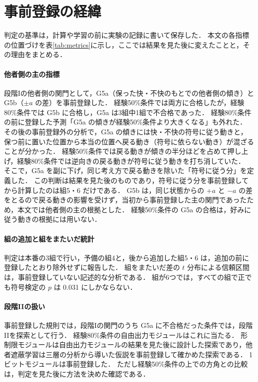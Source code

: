 \section{事前登録の経緯}\label{app:prereg}
判定の基準は，計算や学習の前に実験の記録に書いて保存した．
本文の各指標の位置づけを表\ref{tab:metrics}に示し，ここでは結果を見た後に変えたことと，その理由をまとめる．

\paragraph{他者側の主の指標}
段階Iの他者側の関門として，G5a（保った快・不快のもとでの他者側の傾き）と G5b（$\pm a$ の差）を事前登録した．
経験50\%条件では両方に合格したが，経験80\%条件では G5b に合格し，G5a は3組中1組で不合格であった．
経験80\%条件の前に登録した予測「G5a の傾きが経験50\%条件より大きくなる」も外れた．
その後の事前登録外の分析で，G5a の傾きには快・不快の符号に従う動きと，保つ前に置いた位置から本当の位置へ戻る動き（符号に依らない動き）が混ざることが分かった．
経験50\%条件では戻る動きが傾きの半分ほどを占めて押し上げ，経験80\%条件では逆向きの戻る動きが符号に従う動きを打ち消していた．
そこで，G5a を副に下げ，同じ考え方で戻る動きを除いた「符号に従う分」を定義した．
この判断は結果を見た後のものであり，符号に従う分を事前登録してから計算したのは組5・6 だけである．
G5b は，同じ状態からの $+a$ と $-a$ の差をとるので戻る動きの影響を受けず，当初から事前登録した主の関門であったため，本文では他者側の主の根拠とした．
経験50\%条件の G5a の合格は，好みに従う動きの根拠には用いない．

\paragraph{組の追加と組をまたいだ統計}
判定は本番の3組で行い，予備の組4と，後から追加した組5・6 は，追加の前に登録したとおり除外せずに報告した．
組をまたいだ差の $t$ 分布による信頼区間は，事前登録していない記述的な分析である．
組が6つでは，すべての組で正でも符号検定の $p$ は 0.031 にしかならない．

\paragraph{段階IIの扱い}
事前登録した規則では，段階Iの関門のうち G5a に不合格だった条件では，段階IIを探索として行う．
経験80\%条件の自由出力モジュールはこれに当たる．
形制限モジュールは自由出力モジュールの結果を見た後に設計した探索であり，他者遮蔽学習は三層の分析から導いた仮説を事前登録して確かめた探索である．
1ビットモジュールは事前登録した．
ただし経験50\%条件の上での方角との比較は，判定を見た後に方法を決めた確認である．


